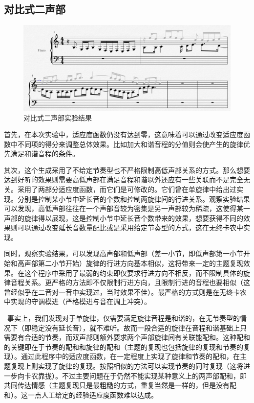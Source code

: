 \documentclass[UTF8,a4paper,10pt]{ctexart}
\begin{document}
    \subsection{对比式二声部}
    
    \begin{figure}[H]
        \begin{center}
            \includegraphics[width=1.0\columnwidth]{eg6.PNG}
            \caption{对比式二声部实验结果}
        \end{center}
    \end{figure}
    首先，在本次实验中，适应度函数仍没有达到零，这意味着可以通过改变适应度函数中不同项的得分来调整总体效果。比如加大和谐音程的分值则会使产生的旋律优先满足和谐音程的条件。\par
    其次，这个生成采用了不给定节奏型也不严格限制高低声部关系的方式。那么想要达到好听的效果则需要高低声部在满足音程和谐以外还应有一些关联而不是完全无关。采用了两部分适应度函数，而它们是可修改的。它们曾在单旋律中给出过实现。分别是控制某小节中延长音的个数和控制两旋律间的行进关系。观察实验结果可以发现，高低声部往往在一个声部音较为密集是另一声部较为稀疏，这使得某一声部的旋律得以展现，这是控制小节中延长音个数带来的效果，想要获得不同的效果则可以通过改变延长音数量配比或是采用给定节奏型的方式，这在无终卡农中实现。\par
    同时，观察实验结果，可以发现高声部和低声部（差一小节，即低声部第一小节开始和高声部第二小节开始）旋律的行进方向基本相似，这将带来一定的主题复现效果。在这个程序中采用了最弱的约束即仅要求行进方向不相反，而不限制具体的旋律音程关系。更严格的方法即不仅限制行进方向，且限制行进的音程也要相似（这曾经似乎在二音对一音中实现过，当时效果不佳）。最严格的方式则是在无终卡农中实现的守调模进（严格模进与音在调上冲突）。\par \
    事实上，我们发现对于单旋律，仅需要满足旋律音程是和谐的，在无节奏型的情况下（即稳定没有延长音），就不难听。故而一段合适的旋律在音程和谐基础上只需要有合适的节奏，而双声部则额外要求两个声部旋律间有关联能配和。这种配和的关键即在于节奏的配和和旋律的配和（主题的复现也包括旋律的复现和节奏的复现）。通过此程序中的适应度函数，在一定程度上实现了旋律和节奏的配和，在主题复现上则实现了旋律的复现。按照相似的方法可以实现节奏的同时复现（这将进一步向卡农靠拢）。不过主要问题在于仍然不能实现某种意义上的两声部配和，即共同传达情感（主题复现只是最粗糙的方式，重复当然是一样的，但是没有配和）。这一点人工给定的经验适应度函数难以达成。
\end{document}
